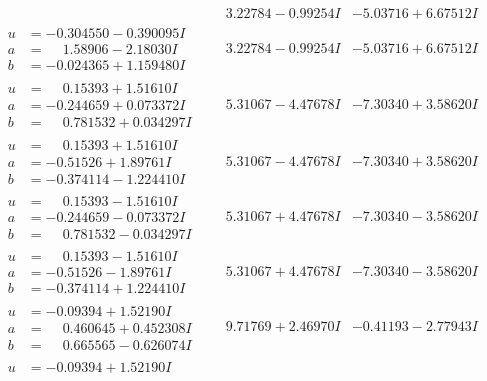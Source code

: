 \documentclass[1p]{elsarticle_modified}
\theoremstyle{definition}
\begin{document}
$$\begin{array}{c|c|c}
 & \phantom{-}3.22784 - 0.99254 I & -5.03716 + 6.67512 I \\ \hline\begin{aligned}
u &= -0.304550 - 0.390095 I \\
a &= \phantom{-}1.58906 - 2.18030 I \\
b &= -0.024365 + 1.159480 I\end{aligned}
 & \phantom{-}3.22784 - 0.99254 I & -5.03716 + 6.67512 I \\ \hline\begin{aligned}
u &= \phantom{-}0.15393 + 1.51610 I \\
a &= -0.244659 + 0.073372 I \\
b &= \phantom{-}0.781532 + 0.034297 I\end{aligned}
 & \phantom{-}5.31067 - 4.47678 I & -7.30340 + 3.58620 I \\ \hline\begin{aligned}
u &= \phantom{-}0.15393 + 1.51610 I \\
a &= -0.51526 + 1.89761 I \\
b &= -0.374114 - 1.224410 I\end{aligned}
 & \phantom{-}5.31067 - 4.47678 I & -7.30340 + 3.58620 I \\ \hline\begin{aligned}
u &= \phantom{-}0.15393 - 1.51610 I \\
a &= -0.244659 - 0.073372 I \\
b &= \phantom{-}0.781532 - 0.034297 I\end{aligned}
 & \phantom{-}5.31067 + 4.47678 I & -7.30340 - 3.58620 I \\ \hline\begin{aligned}
u &= \phantom{-}0.15393 - 1.51610 I \\
a &= -0.51526 - 1.89761 I \\
b &= -0.374114 + 1.224410 I\end{aligned}
 & \phantom{-}5.31067 + 4.47678 I & -7.30340 - 3.58620 I \\ \hline\begin{aligned}
u &= -0.09394 + 1.52190 I \\
a &= \phantom{-}0.460645 + 0.452308 I \\
b &= \phantom{-}0.665565 - 0.626074 I\end{aligned}
 & \phantom{-}9.71769 + 2.46970 I & -0.41193 - 2.77943 I \\ \hline\begin{aligned}
u &= -0.09394 + 1.52190 I \\

\end{aligned}
\end{array}$$
\end{document}
